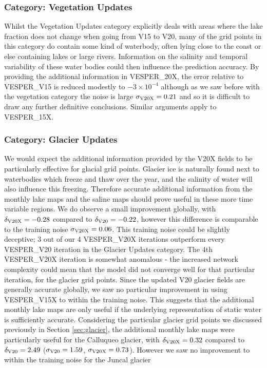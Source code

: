 \documentclass[hess, twostagejnl]{copernicus}
\begin{document}
\subsubsection{Category: Vegetation Updates}
Whilst the Vegetation Updates category explicitly deals with areas where the lake fraction does not change when going from V15 to V20, many of the grid points in this category do contain some kind of waterbody, often lying close to the coast or else containing lakes or large rivers. Information on the salinity and temporal variability of these water bodies could then influence the prediction accuracy. By providing the additional information in VESPER\_20X, the error relative to  VESPER\_V15 is reduced modestly to $-3 \times 10^{-4}$ although as we saw before with the vegetation category the noise is large $\sigma_{\rm V20X} = 0.21$ and so it is difficult to draw any further definitive conclusions. Similar arguments apply to VESPER\_15X.


\subsubsection{Category: Glacier Updates}
We would expect the additional information provided by the V20X fields to be particularly effective for glacial grid points. Glacier ice is naturally found next to waterbodies which freeze and thaw over the year, and the salinity of water will also influence this freezing. Therefore accurate additional information from the monthly lake maps and the saline maps should prove useful in these more time variable regions. We do observe a small improvement globally, with $\delta_{\rm V20X} = -0.28$ compared to $\delta_{\rm V20} = -0.22$, however this difference is comparable to the training noise $\sigma_{\rm V20X} = 0.06$. This training noise could be slightly deceptive;  3 out of our 4 VESPER\_V20X iterations outperform every VESPER\_V20 iteration in the Glacier Updates category. The 4th VESPER\_V20X iteration is somewhat anomalous - the increased network complexity could mean that the model did not converge well for that particular iteration, for the glacier grid points. Since the updated V20 glacier fields are generally accurate globally, we saw no particular  improvement in using VESPER\_V15X to within the training noise. This suggests that the additional monthly lake maps are only useful if the underlying representation of static water is sufficiently accurate. Considering the particular glacier grid points we discussed previously in Section \ref{sec:glacier}, the additional monthly lake maps were particularly useful for the Calluqueo glacier, with $\delta_{\rm V20X} = 0.32$ compared to $\delta_{\rm V20} = 2.49$ ($\sigma_{\rm V20}=1.59$, $\sigma_{\rm V20X}=0.73$). However we saw no improvement to within the training noise for the Juncal glacier 
\end{document}
